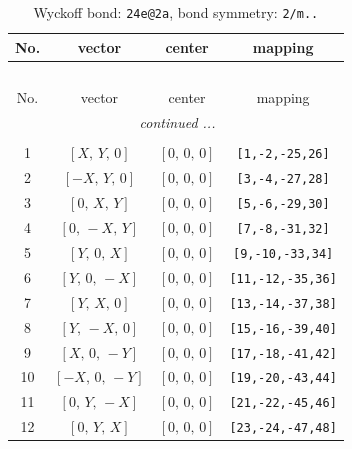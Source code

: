 \documentclass[fleqn,8pt]{jsarticle}
\begin{document}
\begin{longtable}{cccc}
\caption{Wyckoff bond: {\tt 24e@2a}, bond symmetry: {\tt 2/m..}}
 \\
 \hline \hline
No. & vector & center & mapping \\ \hline \endfirsthead

\multicolumn{3}{l}{\tablename\ \thetable{}} \\
 \hline \hline
No. & vector & center & mapping \\ \hline \endhead

 \hline \hline
\multicolumn{3}{r}{\footnotesize\it continued ...} \\ \endfoot

 \hline \hline
\multicolumn{3}{r}{} \\ \endlastfoot

1 & $\left[ X,\, Y,\, 0 \right]$ & $\left[ 0,\, 0,\, 0 \right]$ & {\tt [1,-2,-25,26]} \\ \hline
2 & $\left[ - X,\, Y,\, 0 \right]$ & $\left[ 0,\, 0,\, 0 \right]$ & {\tt [3,-4,-27,28]} \\ \hline
3 & $\left[ 0,\, X,\, Y \right]$ & $\left[ 0,\, 0,\, 0 \right]$ & {\tt [5,-6,-29,30]} \\ \hline
4 & $\left[ 0,\, - X,\, Y \right]$ & $\left[ 0,\, 0,\, 0 \right]$ & {\tt [7,-8,-31,32]} \\ \hline
5 & $\left[ Y,\, 0,\, X \right]$ & $\left[ 0,\, 0,\, 0 \right]$ & {\tt [9,-10,-33,34]} \\ \hline
6 & $\left[ Y,\, 0,\, - X \right]$ & $\left[ 0,\, 0,\, 0 \right]$ & {\tt [11,-12,-35,36]} \\ \hline
7 & $\left[ Y,\, X,\, 0 \right]$ & $\left[ 0,\, 0,\, 0 \right]$ & {\tt [13,-14,-37,38]} \\ \hline
8 & $\left[ Y,\, - X,\, 0 \right]$ & $\left[ 0,\, 0,\, 0 \right]$ & {\tt [15,-16,-39,40]} \\ \hline
9 & $\left[ X,\, 0,\, - Y \right]$ & $\left[ 0,\, 0,\, 0 \right]$ & {\tt [17,-18,-41,42]} \\ \hline
10 & $\left[ - X,\, 0,\, - Y \right]$ & $\left[ 0,\, 0,\, 0 \right]$ & {\tt [19,-20,-43,44]} \\ \hline
11 & $\left[ 0,\, Y,\, - X \right]$ & $\left[ 0,\, 0,\, 0 \right]$ & {\tt [21,-22,-45,46]} \\ \hline
12 & $\left[ 0,\, Y,\, X \right]$ & $\left[ 0,\, 0,\, 0 \right]$ & {\tt [23,-24,-47,48]} \\
\end{longtable}
\renewcommand{\arraystretch}{1.2}
\end{document}
